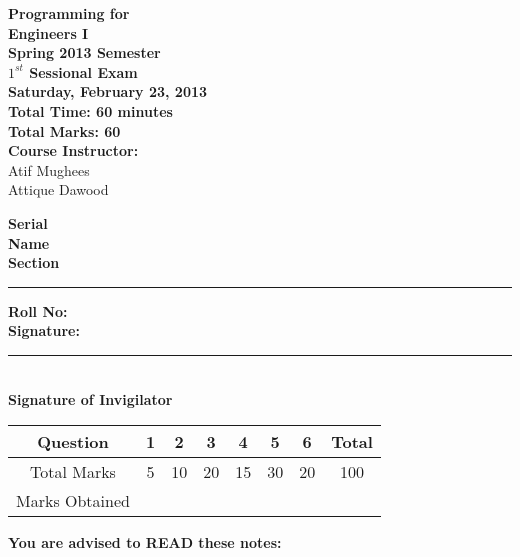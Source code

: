 \documentclass[12pt,a4paper]{article}
\def\QOne{5}
\def\Qtwo{10}
\def\Qthree{20}
\def\Qfour{15}
\def\Qfive{30}
\def\Qsix{20}
\def\TotalMarks{100}
\begin{document}
\begin{minipage}{0.55\textwidth}
{\LARGE \textbf{Programming for\\ Engineers I}}\\[0.15cm]
{\normalsize \textbf{Spring 2013 Semester}}\\
{\Large \textbf{$1^{st}$ Sessional Exam}}\\
{\normalsize \textbf{Saturday, February 23, 2013}}\\[0.30cm]
{\Large \textbf{Total Time: 60 minutes}}\\[0.15cm]
{\Large \textbf{Total Marks: 60}}\\
\textbf{Course Instructor:}\\
Atif Mughees\\
Attique Dawood\\
\end{minipage}
\begin{minipage}{0.4\textwidth}
\textbf{Serial} \hrulefill \\[0.25cm]
\textbf{Name} \hrulefill\\[0.25cm]
\textbf{Section} \rule{1cm}{0.2mm} \textbf{Roll No:} \hrulefill\\[0.25cm]
\textbf{Signature:} \hrulefill\\[0.25cm]
\rule{6.6cm}{0.2mm}\\
\textbf{Signature of Invigilator}\\[0.25cm]
\end{minipage}
\begin{table}[H]
\begin{center}
\vspace{0.3cm}
	{\Large \begin{tabular}{|c|c|c|c|c|c|c|c|}
	\hline
		\rule{0pt}{2.6ex} Question & \textbf{1} & \textbf{2} & \textbf{3} & \textbf{4} & \textbf{5} & \textbf{6} & \textbf{Total}\\
		\hline
		Total Marks \rule{0pt}{2.6ex} & \QOne & \Qtwo & \Qthree & \Qfour & \Qfive & \Qsix & \TotalMarks\\
		\hline
		Marks Obtained & & & & & & &\\
	\hline
	\end{tabular}}
\end{center}
\end{table}
\noindent \textbf{You are advised to READ these notes:}
\end{document}
